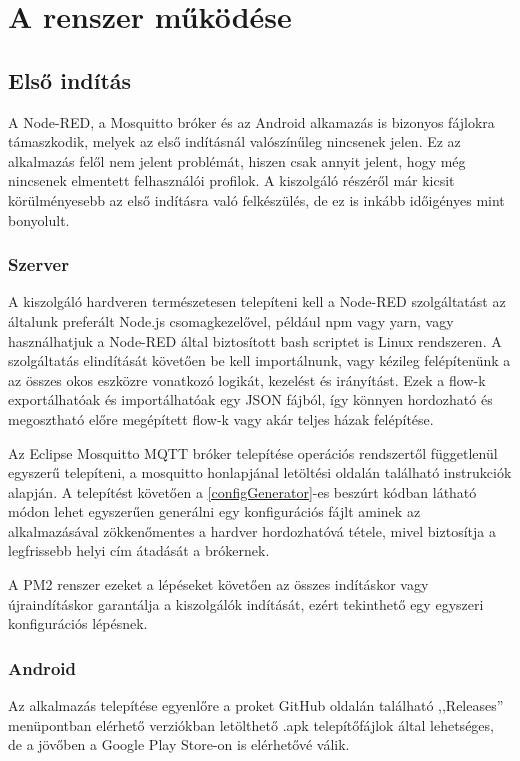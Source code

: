 \documentclass[
]{thesis-ekf}
\theoremstyle{definition}
\theoremstyle{remark}
\begin{document}
\chapter{A renszer működése}
\section{Első indítás}
A Node-RED, a Mosquitto bróker és az Android alkamazás is bizonyos fájlokra támaszkodik, melyek az első indításnál
valószínűleg nincsenek jelen. Ez az alkalmazás felől nem jelent problémát, hiszen csak annyit jelent, hogy még nincsenek
elmentett felhasználói profilok. A kiszolgáló részéről már kicsit körülményesebb az első indításra való felkészülés,
de ez is inkább időigényes mint bonyolult.
\subsection{Szerver}
A kiszolgáló hardveren természetesen telepíteni kell a Node-RED szolgáltatást az általunk preferált Node.js
csomagkezelővel, például npm vagy yarn, vagy használhatjuk a Node-RED által biztosított bash scriptet is Linux rendszeren.
A szolgáltatás elindítását követően be kell importálnunk, vagy kézileg felépítenünk a az összes okos eszközre vonatkozó
logikát, kezelést és irányítást. Ezek a flow-k exportálhatóak és importálhatóak egy JSON fájból, így könnyen hordozható
és megosztható előre megépített flow-k vagy akár teljes házak felépítése.

Az Eclipse Mosquitto MQTT bróker telepítése operációs rendszertől függetlenül egyszerű telepíteni, a mosquitto
honlapjánal letöltési oldalán található instrukciók alapján. A telepítést követően a \ref{configGenerator}-es
beszúrt kódban látható módon lehet egyszerűen generálni egy konfigurációs fájlt aminek az alkalmazásával
zökkenőmentes a hardver hordozhatóvá tétele, mivel biztosítja a legfrissebb helyi cím átadását a brókernek.

A PM2 renszer ezeket a lépéseket követően az összes indításkor vagy újraindításkor garantálja a kiszolgálók
indítását, ezért tekinthető egy egyszeri konfigurációs lépésnek.


\subsection{Android}
Az alkalmazás telepítése egyenlőre a proket GitHub oldalán\cite{github}
található ,,Releases'' menüpontban elérhető verziókban letölthető .apk telepítőfájlok által lehetséges, de a jövőben
a Google Play Store-on is elérhetővé válik.
\end{document}
